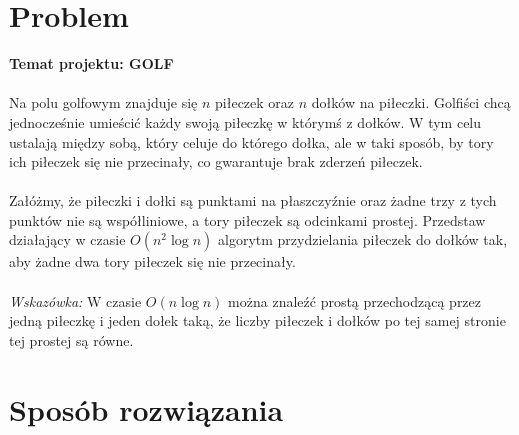 \documentclass[10pt,a4paper]{article}
\begin{document}
	
	\section{Problem}
	
	\textbf{Temat projektu: GOLF} \\~\\
	Na polu golfowym znajduje się $n$ piłeczek oraz $n$ dołków na piłeczki. Golfiści chcą jednocześnie umieścić każdy swoją piłeczkę w którymś z dołków. W tym celu ustalają między sobą, który celuje do którego dołka, ale w taki sposób, by tory ich	piłeczek się nie przecinały, co gwarantuje brak zderzeń piłeczek.\\~\\ 
	Załóżmy, że piłeczki i dołki są punktami na płaszczyźnie oraz żadne trzy z tych punktów nie są współliniowe, a tory piłeczek są odcinkami prostej. Przedstaw działający w czasie $O(n^2\log n)$ algorytm przydzielania piłeczek do dołków tak, aby żadne dwa tory piłeczek się nie przecinały.\\~\\
	\textit{Wskazówka:} W czasie $O(n\log n)$ można znaleźć prostą przechodzącą przez jedną piłeczkę i jeden dołek taką, że liczby piłeczek i dołków po tej samej stronie tej prostej są równe.
	
	\section{Sposób rozwiązania}
	
\end{document}
